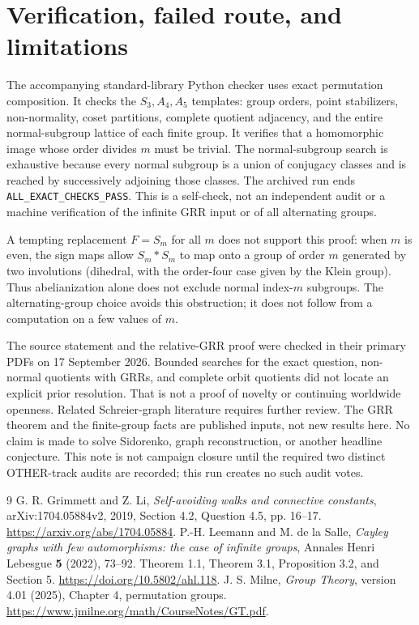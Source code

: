 \documentclass[11pt]{article}
\begin{document}
\section{Verification, failed route, and limitations}
The accompanying standard-library Python checker uses exact permutation
composition. It checks the $S_3,A_4,A_5$ templates: group orders, point
stabilizers, non-normality, coset partitions, complete quotient adjacency,
and the entire normal-subgroup lattice of each finite group. It verifies
that a homomorphic image whose order divides $m$ must be trivial. The
normal-subgroup search is exhaustive because every normal subgroup is
a union of conjugacy classes and is reached by successively adjoining
those classes. The archived run ends \texttt{ALL\_EXACT\_CHECKS\_PASS}.
This is a self-check, not an independent audit or a machine verification
of the infinite GRR input or of all alternating groups.

A tempting replacement $F=S_m$ for all $m$ does not support this proof:
when $m$ is even, the sign maps allow $S_m*S_m$ to map onto a group of
order $m$ generated by two involutions (dihedral, with the order-four
case given by the Klein group). Thus abelianization alone does not
exclude normal index-$m$ subgroups. The alternating-group choice avoids
this obstruction; it does not follow from a computation on a few values
of $m$.

The source statement and the relative-GRR proof were checked in their
primary PDFs on 17 September 2026. Bounded searches for the exact question,
non-normal quotients with GRRs, and complete orbit quotients did not locate
an explicit prior resolution. That is not a proof of novelty or continuing
worldwide openness. Related Schreier-graph literature requires further
review. The GRR theorem and the finite-group facts are published inputs,
not new results here. No claim is made to solve Sidorenko, graph
reconstruction, or another headline conjecture. This note is not campaign
closure until the required two distinct OTHER-track audits are recorded;
this run creates no such audit votes.

\begin{thebibliography}{9}
 G. R. Grimmett and Z. Li,
\emph{Self-avoiding walks and connective constants},
arXiv:1704.05884v2, 2019, Section 4.2, Question 4.5, pp. 16--17.
\url{https://arxiv.org/abs/1704.05884}.
 P.-H. Leemann and M. de la Salle,
\emph{Cayley graphs with few automorphisms: the case of infinite groups},
Annales Henri Lebesgue \textbf{5} (2022), 73--92.
Theorem 1.1, Theorem 3.1, Proposition 3.2, and Section 5.
\url{https://doi.org/10.5802/ahl.118}.
 J. S. Milne, \emph{Group Theory}, version 4.01 (2025),
Chapter 4, permutation groups.
\url{https://www.jmilne.org/math/CourseNotes/GT.pdf}.
\end{thebibliography}
\end{document}
